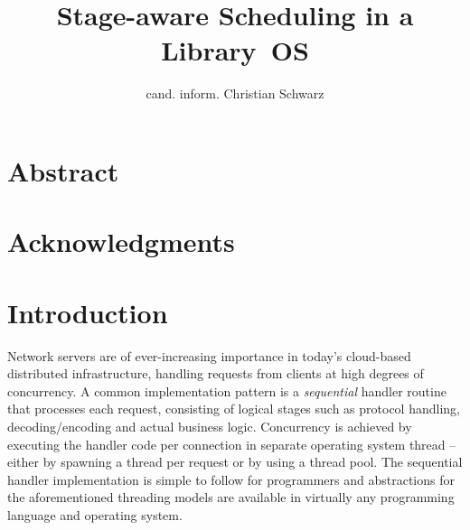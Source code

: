 \documentclass[12pt,a4paper]{book}
\begin{document}
\frontmatter
{}

\title{Stage-aware Scheduling in a Library~OS}
\author{cand. inform. Christian Schwarz}
\maketitle



\chapter{Abstract}
\chapter{Acknowledgments}

\mainmatter
\cleardoublepage
{}
{}
\tableofcontents

\chapter{Introduction}
Network servers are of ever-increasing importance in today's cloud-based distributed infrastructure, handling requests from clients at high degrees of concurrency.
A common implementation pattern is a \emph{sequential} handler routine that processes each request, consisting of logical stages such as protocol handling, decoding/encoding and actual business logic.
Concurrency is achieved by executing the handler code per connection in separate operating system thread -- either by spawning a thread per request or by using a thread pool.
The sequential handler implementation is simple to follow for programmers and abstractions for the aforementioned threading models are available in virtually any programming language and operating system.~\cite{flashwebsrv,c10k}
\end{document}
